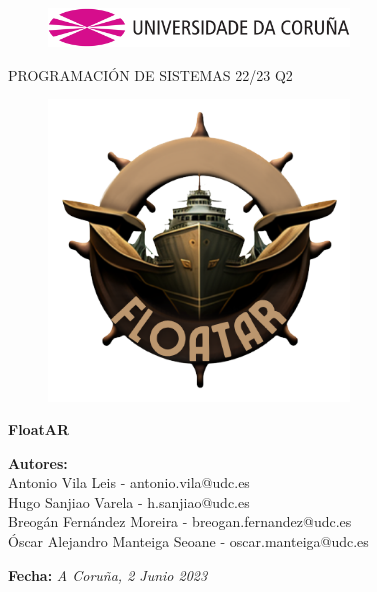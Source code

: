 \documentclass[a4paper, openright, 12pt]{article}
\begin{document}
\begin{titlepage}

\begin{center}
\vspace*{-1in}
\begin{figure}[htb]
\begin{center}
\includegraphics[width=8cm]{udc.eps}
\end{center}
\end{figure}

\vspace*{1in}
PROGRAMACIÓN DE SISTEMAS 22/23 Q2\\
\begin{figure}[htb]
\begin{center}
\includegraphics[width=8cm]{icono.png}
\end{center}
\end{figure}
\begin{Large}
\textbf{FloatAR} \\
\end{Large}

\vspace*{1in}

\begin{large}
\raggedleft
\textbf{Autores:}\\
{Antonio Vila Leis - antonio.vila@udc.es\\Hugo Sanjiao Varela - h.sanjiao@udc.es\\Breogán Fernández Moreira - breogan.fernandez@udc.es\\Óscar Alejandro Manteiga Seoane - oscar.manteiga@udc.es\\}

\vspace{1in}

\textbf{Fecha:}\textit{ A Coruña, 2 Junio 2023}\\
\end{large}

\end{center}
\end{titlepage} 
\end{document}

